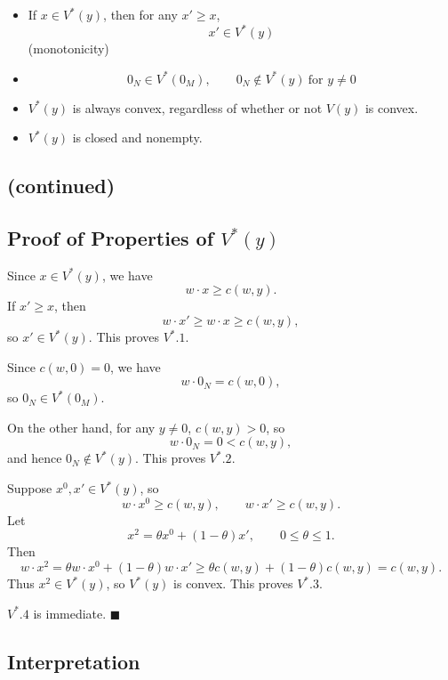 \begin{itemize}
    \item[$V^*$.1] If $x \in V^*(y)$, then for any $x' \ge x$,
    \[
    x' \in V^*(y)
    \]
    \hfill (monotonicity)

    \item[$V^*$.2]
    \[
    0_N \in V^*(0_M),
    \qquad
    0_N \notin V^*(y)\ \text{for } y \ne 0
    \]

    \item[$V^*$.3] $V^*(y)$ is always convex, regardless of whether or not $V(y)$ is convex.

    \item[$V^*$.4] $V^*(y)$ is closed and nonempty.
\end{itemize}




\subsection*{(continued)}

\subsection*{Proof of Properties of $V^*(y)$}

Since $x \in V^*(y)$, we have
\[
w \cdot x \ge c(w,y).
\]
If $x' \ge x$, then
\[
w \cdot x' \ge w \cdot x \ge c(w,y),
\]
so $x' \in V^*(y)$. This proves $V^*.1$.

\medskip

Since $c(w,0)=0$, we have
\[
w \cdot 0_N = c(w,0),
\]
so $0_N \in V^*(0_M)$.

On the other hand, for any $y \ne 0$, $c(w,y)>0$, so
\[
w \cdot 0_N = 0 < c(w,y),
\]
and hence $0_N \notin V^*(y)$. This proves $V^*.2$.

\medskip

Suppose $x^0, x' \in V^*(y)$, so
\[
w \cdot x^0 \ge c(w,y),
\qquad
w \cdot x' \ge c(w,y).
\]
Let
\[
x^2 = \theta x^0 + (1-\theta)x', \qquad 0 \le \theta \le 1.
\]
Then
\[
w \cdot x^2
=
\theta w \cdot x^0 + (1-\theta) w \cdot x'
\ge
\theta c(w,y) + (1-\theta)c(w,y)
=
c(w,y).
\]
Thus $x^2 \in V^*(y)$, so $V^*(y)$ is convex. This proves $V^*.3$.

\medskip

$V^*.4$ is immediate. \hfill $\blacksquare$

\subsection*{Interpretation}

